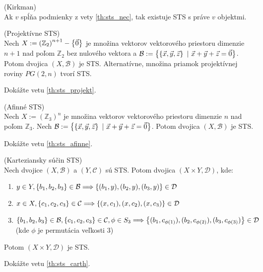 \begin{theorem_hard}{(Kirkman)}\\
Ak $v$ spĺňa podmienky z vety \ref{th:sts_nec}, tak existuje STS s práve $v$ objektmi.
\end{theorem_hard}

\begin{theorem}{(Projektívne STS)}\\
\label{th:sts_projekt}
Nech $X := \left(\mathbb{Z}_2\right)^{n+1} - \left\{\vec{0}\right\}$ je množina vektorov vektorového priestoru dimenzie $n+1$ nad poľom $\mathbb{Z}_2$ bez nulového vektora a 
$\mathcal{B} := \left\{\left\{\vec{x}, \vec{y}, \vec{z}\right\} ~|~ \vec{x} + \vec{y} + \vec{z} = \vec{0}\right\}$.
Potom dvojica $(X, \mathcal{B})$ je STS. Alternatívne, množina priamok projektívnej roviny $PG(2, n)$ tvorí STS.
\end{theorem}
\begin{exercise}
Dokážte vetu \ref{th:sts_projekt}.
\end{exercise}

\begin{theorem}{(Afinné STS)}\\
\label{th:sts_afinne}
Nech $X := \left(\mathbb{Z}_3\right)^{n}$ je množina vektorov vektorového priestoru dimenzie $n$ nad poľom $\mathbb{Z}_3$. 
Nech $\mathcal{B} := \left\{\left\{\vec{x}, \vec{y}, \vec{z}\right\} ~|~ \vec{x} + \vec{y} + \vec{z} = \vec{0}\right\}$. Potom 
dvojica $(X, \mathcal{B})$ je STS.
\end{theorem}
\begin{exercise}
Dokážte vetu \ref{th:sts_afinne}.
\end{exercise}

\begin{theorem}{(Karteziansky súčin STS)}\\
\label{th:sts_carth}
Nech dvojice $(X, \mathcal{B})$ a $(Y, \mathcal{C})$ sú STS. Potom dvojica $(X \times Y, \mathcal{D})$, kde:
\begin{enumerate}
    \item $y \in Y, \left\{b_1, b_2, b_3\right\} \in \mathcal{B} \Longrightarrow \left\{(b_1, y), (b_2, y), (b_3, y)\right\} \in \mathcal{D}$
    \item $x \in X, \left\{c_1, c_2, c_3\right\} \in \mathcal{C} \Longrightarrow \left\{(x, c_1), (x, c_2), (x, c_3)\right\} \in \mathcal{D}$
    \item $\left\{b_1, b_2, b_3\right\} \in \mathcal{B}, \left\{c_1, c_2, c_3\right\} \in \mathcal{C}, \phi \in S_3 \Longrightarrow 
            \left\{(b_1, c_{\phi(1)}), (b_2, c_{\phi(2)}), (b_3, c_{\phi(3)})\right\} \in \mathcal{D}$ (kde $\phi$ je permutácia veľkosti $3$) 
\end{enumerate}
Potom $(X \times Y, \mathcal{D})$ je STS.
\end{theorem}
\begin{exercise}
Dokážte vetu \ref{th:sts_carth}.
\end{exercise}


